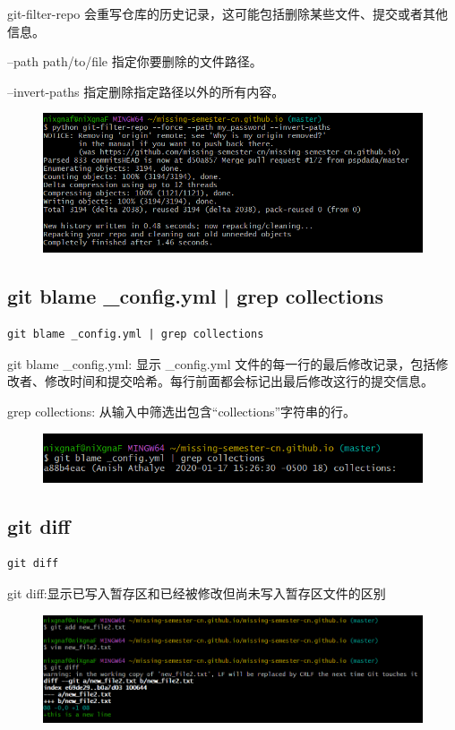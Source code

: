 \documentclass{article}
\begin{document}
\noindent git-filter-repo 会重写仓库的历史记录，这可能包括删除某些文件、提交或者其他信息。

\noindent --path path/to/file 指定你要删除的文件路径。

\noindent --invert-paths 指定删除指定路径以外的所有内容。
\begin{figure}[h]
    \centering
    \includegraphics[width=1\linewidth]{picture/gitfilter.png}
\end{figure}

\subsection{git blame \_config.yml | grep collections}
\begin{lstlisting}
git blame _config.yml | grep collections
\end{lstlisting}

\noindent git blame \_config.yml: 显示 \_config.yml 文件的每一行的最后修改记录，包括修改者、修改时间和提交哈希。每行前面都会标记出最后修改这行的提交信息。

\noindent grep collections: 从输入中筛选出包含“collections”字符串的行。
\begin{figure}[h]
    \centering
    \includegraphics[width=1\linewidth]{picture/gitblame.png}
\end{figure}

\newpage
\subsection{git diff}
\begin{lstlisting}
git diff
\end{lstlisting}

\noindent git diff:显示已写入暂存区和已经被修改但尚未写入暂存区文件的区别
\begin{figure}[h]
    \centering
    \includegraphics[width=1\linewidth]{picture/gitdiff.png}
\end{figure}
\end{document}
